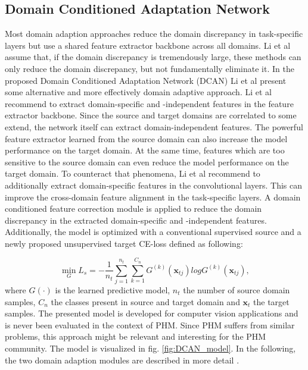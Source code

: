 \subsection{Domain Conditioned Adaptation Network}
Most domain adaption approaches reduce the domain discrepancy in task-specific layers but use a shared feature extractor backbone across all domains. Li et al \cite{li2020} assume that, if the domain discrepancy is tremendously large, these methods can only reduce the domain discrepancy, but not fundamentally eliminate it. In the proposed Domain Conditioned Adaptation Network (DCAN) Li et al present some alternative and more effectively domain adaptive approach. Li et al recommend to extract domain-specific and -independent features in the feature extractor backbone. Since the source and target domains are correlated to some extend, the network itself can extract domain-independent features. The powerful feature extractor learned from the source domain can also increase the model performance on the target domain. At the same time, features which are too sensitive to the source domain can even reduce the model performance on the target domain. To counteract that phenomena, Li et al recommend to additionally extract domain-specific features in the convolutional layers. This can improve the cross-domain feature alignment in the task-specific layers. A domain conditioned feature correction module is applied to reduce the domain discrepancy in the extracted domain-specific and -independent features. Additionally, the model is optimized with a conventional supervised source and a newly proposed unsupervised target CE-loss defined as following:

\begin{equation}
    \min_{G} L_{s} = -\frac{1}{n_{t}} \sum_{j=1}^{n_{t}} \sum_{k=1}^{C_{n}} G^{(k)}(\pmb{x}_{tj})logG^{(k)}(\pmb{x}_{tj}),
\end{equation}
where $G(\cdot)$ is the learned predictive model, $n_{t}$ the number of source domain samples, $C_{n}$ the classes present in source and target domain and $\pmb{x}_{t}$ the target samples. The presented model is developed for computer vision applications and is never been evaluated in the context of PHM. Since PHM suffers from similar problems, this approach might be relevant and interesting for the PHM community. The model is visualized in fig. \ref{fig:DCAN_model}. In the following, the two domain adaption modules are described in more detail \cite{li2020}. 

